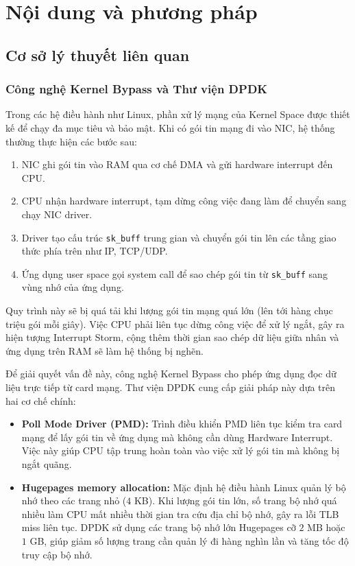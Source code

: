 \documentclass[12pt,a4paper,twoside]{report}
\begin{document}
\newpage
\chapter{Nội dung và phương pháp}

\section{Cơ sở lý thuyết liên quan}

\subsection{Công nghệ Kernel Bypass và Thư viện DPDK}
Trong các hệ điều hành như Linux, phần xử lý mạng của Kernel Space được thiết kế để chạy đa mục tiêu và bảo mật. Khi có gói tin mạng đi vào NIC, hệ thống thường thực hiện các bước sau:
\begin{enumerate}
    \item NIC ghi gói tin vào RAM qua cơ chế DMA và gửi hardware interrupt đến CPU.
    \item CPU nhận hardware interrupt, tạm dừng công việc đang làm để chuyển sang chạy NIC driver.
    \item Driver tạo cấu trúc \texttt{sk\_buff} trung gian và chuyển gói tin lên các tầng giao thức phía trên như IP, TCP/UDP.
    \item Ứng dụng user space gọi system call để sao chép gói tin từ \texttt{sk\_buff} sang vùng nhớ của ứng dụng.
\end{enumerate}

Quy trình này sẽ bị quá tải khi lượng gói tin mạng quá lớn (lên tới hàng chục triệu gói mỗi giây). Việc CPU phải liên tục dừng công việc để xử lý ngắt, gây ra hiện tượng Interrupt Storm, cộng thêm thời gian sao chép dữ liệu giữa nhân và ứng dụng trên RAM sẽ làm hệ thống bị nghẽn.

Để giải quyết vấn đề này, công nghệ Kernel Bypass cho phép ứng dụng đọc dữ liệu trực tiếp từ card mạng. Thư viện DPDK cung cấp giải pháp này dựa trên hai cơ chế chính:
\begin{itemize}
    \item \textbf{Poll Mode Driver (PMD):} Trình điều khiển PMD liên tục kiểm tra card mạng để lấy gói tin về ứng dụng mà không cần dùng Hardware Interrupt. Việc này giúp CPU tập trung hoàn toàn vào việc xử lý gói tin mà không bị ngắt quãng.
    \item \textbf{Hugepages memory allocation:} Mặc định hệ điều hành Linux quản lý bộ nhớ theo các trang nhỏ ($4$ KB). Khi lượng gói tin lớn, số trang bộ nhớ quá nhiều làm CPU mất nhiều thời gian tra cứu địa chỉ bộ nhớ, gây ra lỗi TLB miss liên tục. DPDK sử dụng các trang bộ nhớ lớn Hugepages cỡ $2$ MB hoặc $1$ GB, giúp giảm số lượng trang cần quản lý đi hàng nghìn lần và tăng tốc độ truy cập bộ nhớ.
\end{itemize}
\end{document}
